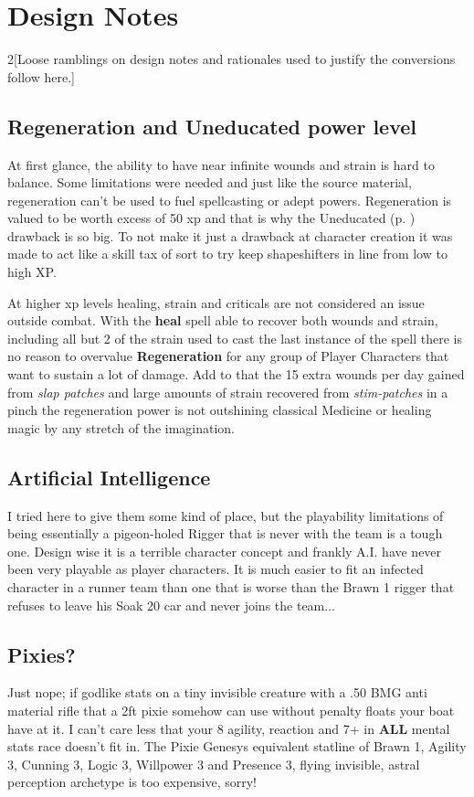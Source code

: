\documentclass{book}
\begin{document}
\section{Design Notes}
\begin{multicols}{2}[Loose ramblings on design notes and rationales used to justify the conversions follow here.]
\subsection{Regeneration and Uneducated power level}
At first glance, the ability to have near infinite wounds and strain is hard to balance. Some limitations were needed and just like the source material, regeneration can't be used to fuel spellcasting or adept powers. Regeneration is valued to be worth excess of 50 xp and that is why the Uneducated (p. \pageref{uneducated}) drawback is so big. To not make it just a drawback at character creation it was made to act like a skill tax of sort to try keep shapeshifters in line from low to high XP.

At higher xp levels healing, strain and criticals are not considered an issue outside combat. With the \textbf{heal} spell able to recover both wounds and strain, including all but 2 of the strain used to cast the last instance of the spell there is no reason to overvalue \textbf{Regeneration} for any group of Player Characters that want to sustain a lot of damage. Add to that the 15 extra wounds per day gained from \textit{slap patches} and large amounts of strain recovered from \textit{stim-patches} in a pinch the regeneration power is not outshining classical Medicine or healing magic by any stretch of the imagination.

\subsection{Artificial Intelligence}
I tried  here to give them some kind of place, but the playability limitations of being essentially a pigeon-holed Rigger that is never with the team is a tough one. Design wise it is a terrible character concept and frankly A.I. have never been very playable as player characters. It is much easier to fit an infected character in a runner team than one that is worse than the Brawn 1 rigger that refuses to leave his Soak 20 car and never joins the team...

\subsection{Pixies?}
Just nope; if godlike stats on a tiny invisible creature with a .50 BMG anti material rifle that a 2ft pixie somehow can use without penalty floats your boat have at it. I can't care less that your 8 agility, reaction and 7+ in \textbf{ALL} mental stats race doesn't fit in. The Pixie Genesys equivalent statline of Brawn 1, Agility 3, Cunning 3, Logic 3, Willpower 3 and Presence 3, flying invisible, astral perception archetype is too expensive, sorry!


\end{multicols}
\end{document}
